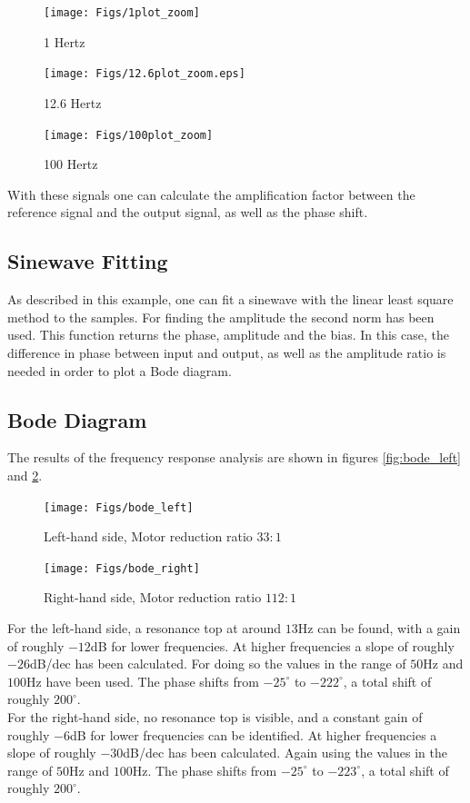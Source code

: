 	
	\begin{figure}[!htb]
		\texttt{[image: Figs/1plot\_zoom]}
		\caption{1 Hertz}\label{fig:1plot_zoom}
		\endminipage\hfill
		\texttt{[image: Figs/12.6plot\_zoom.eps]}
		\caption{12.6 Hertz}\label{fig:12.6plot_zoom}
		\endminipage\hfill
		\texttt{[image: Figs/100plot\_zoom]}
		\caption{100 Hertz}\label{fig:100plot_zoom}
		\endminipage
	\end{figure}
	With these signals one can calculate the amplification factor between the reference signal and the output signal, as well as the phase shift.
	
	
	\subsection{Sinewave Fitting}
	As described in this example\cite{exnumerus2010}, one can fit a sinewave with the linear least square method to the samples. For finding the amplitude the second norm%
	 has been used. This function returns the phase, amplitude and the bias. In this case, the difference in phase between input and output, as well as the amplitude ratio is needed in order to plot a Bode diagram.
	
	\subsection{Bode Diagram}
	The results of the frequency response analysis are shown in figures \ref{fig:bode_left} and \ref{fig:bode_right}.
	
	\begin{figure}[!htb]
		\texttt{[image: Figs/bode\_left]}
		\caption{Left-hand side, Motor reduction ratio $33:1$}\label{fig:bode_left}
		\endminipage\hfill
		\texttt{[image: Figs/bode\_right]}
		\caption{Right-hand side, Motor reduction ratio $112:1$}\label{fig:bode_right}
		\endminipage\hfill
	\end{figure}

	For the left-hand side, a resonance top at around $13$Hz can be found, with a gain of roughly $-12$dB for lower frequencies. At higher frequencies a slope of roughly $-26$dB/dec has been calculated. For doing so the values in the range of $50$Hz and $100$Hz have been used. The phase shifts from $-25^\circ$ to $-222^\circ$, a total shift of roughly $200^\circ$.\\
	For the right-hand side, no resonance top is visible, and a constant gain of roughly $-6$dB for lower frequencies can be identified. At higher frequencies a slope of roughly $-30$dB/dec has been calculated. Again using the values in the range of $50$Hz and $100$Hz. The phase shifts from $-25^\circ$ to $-223^\circ$, a total shift of roughly $200^\circ$.
	
